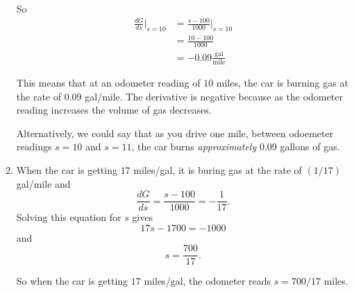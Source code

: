 \documentclass{ximera}
\begin{document}
\begin{question}
\begin{explanation}
\begin{enumerate}
So
\begin{align*}
 \frac{dG}{ds}\Big|_{s=10} &= \frac{s-100}{1000} \Big|_{s=10} \\
                                        &=\frac{10-100}{1000} \\
                                        &= -0.09 \frac{\text{gal}}{\text{mile}}
\end{align*}

This means that at an odometer reading of $10$ miles, the car is burning gas at the rate of $0.09$ gal/mile. The derivative is negative because as the odometer reading increases the volume of gas decreases. 

Alternatively, we could say that as you drive one mile, between odoemeter readings $s=10$ and $s=11$, the car burns \emph{approximately} 0.09 gallons of gas.


\item When the car is getting $17$ miles/gal, it is buring gas at the rate of $(1/17)$ gal/mile and 
\[
       \frac{dG}{ds} = \frac{s-100}{1000} = - \frac{1}{17} .
\]
Solving this equation for $s$ gives
\[
   17s - 1700 = -1000
\]
and
\[
    s = \frac{700}{17} .
\]

So when the car is getting $17$ miles/gal, the odometer reads $s=700/17$ miles.
\end{enumerate}

\end{explanation}

\end{question}
\end{document}
